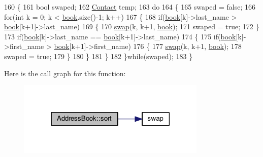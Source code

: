\begin{DoxyCode}
160 \{
161    \textcolor{keywordtype}{bool} swaped;
162    \hyperlink{classContact}{Contact} temp;
163    \textcolor{keywordflow}{do}
164    \{
165       swaped = \textcolor{keyword}{false};
166       \textcolor{keywordflow}{for}(\textcolor{keywordtype}{int} k = 0; k < \hyperlink{classAddressBook_a2a42a2a0314d0b2c788834caf03b452e}{book}.size()-1; k++)
167       \{
168          \textcolor{keywordflow}{if}(\hyperlink{classAddressBook_a2a42a2a0314d0b2c788834caf03b452e}{book}[k]->last\_name > \hyperlink{classAddressBook_a2a42a2a0314d0b2c788834caf03b452e}{book}[k+1]->last\_name)
169          \{
170             \hyperlink{classAddressBook_ae299771d51ad4ea07d52fbfedb2d6e93}{swap}(k, k+1, \hyperlink{classAddressBook_a2a42a2a0314d0b2c788834caf03b452e}{book});
171             swaped = \textcolor{keyword}{true};
172          \}
173          \textcolor{keywordflow}{if}(\hyperlink{classAddressBook_a2a42a2a0314d0b2c788834caf03b452e}{book}[k]->last\_name == \hyperlink{classAddressBook_a2a42a2a0314d0b2c788834caf03b452e}{book}[k+1]->last\_name)
174          \{
175             \textcolor{keywordflow}{if}(\hyperlink{classAddressBook_a2a42a2a0314d0b2c788834caf03b452e}{book}[k]->first\_name > \hyperlink{classAddressBook_a2a42a2a0314d0b2c788834caf03b452e}{book}[k+1]->first\_name)
176             \{
177                \hyperlink{classAddressBook_ae299771d51ad4ea07d52fbfedb2d6e93}{swap}(k, k+1, \hyperlink{classAddressBook_a2a42a2a0314d0b2c788834caf03b452e}{book});
178                swaped = \textcolor{keyword}{true};
179             \}
180          \}
181       \}  
182    \}\textcolor{keywordflow}{while}(swaped);
183 \}
\end{DoxyCode}


Here is the call graph for this function\+:
\nopagebreak
\begin{figure}[H]
\begin{center}
\leavevmode
\includegraphics[width=254pt]{classAddressBook_a7021de85815ec3aed9d2173fc15faa9b_cgraph}
\end{center}
\end{figure}




